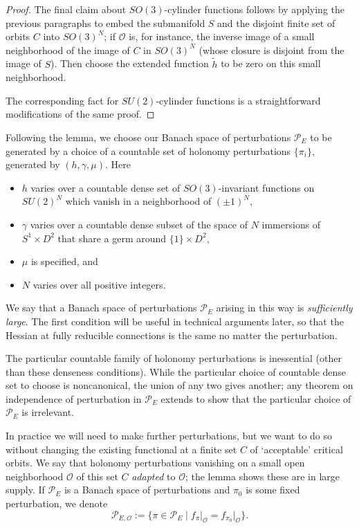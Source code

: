 \documentclass{memo-l}
\theoremstyle{definition}
\theoremstyle{remark}
\numberwithin{section}{chapter}
\numberwithin{equation}{chapter}
\begin{document}
\begin{proof}
The final claim about $SO(3)$-cylinder functions follows by applying the previous paragraphs to embed the submanifold $S$ and the disjoint finite set of orbits $C$ into $SO(3)^N$; if $\mathcal O$ is, for instance, the inverse image of a small neighborhood of the image of $C$ in $SO(3)^N$ (whose closure is disjoint from the image of $S$). Then choose the extended function $\tilde h$ to be zero on this small neighborhood.

The corresponding fact for $SU(2)$-cylinder functions is a straightforward modifications of the same proof.
\end{proof}

Following the lemma, we choose our Banach space of perturbations $\mathcal P_E$ to be generated by a choice of a countable set of holonomy perturbations $\{\pi_i\}$, generated by $(h, \gamma, \mu)$. Here 
\begin{itemize}
\item $h$ varies over a countable dense set of $SO(3)$-invariant functions on $SU(2)^N$ which vanish in a neighborhood of $(\pm 1)^N$,
\item $\gamma$ varies over a countable dense subset of the space of $N$ immersions of $S^1 \times D^2$ that share a germ around $\{1\} \times D^2$, 
\item $\mu$ is specified, and 
\item $N$ varies over all positive integers. 
\end{itemize} 

We say that a Banach space of perturbations $\mathcal P_E$ arising in this way is \textit{sufficiently large}. The first condition will be useful in technical arguments later, so that the Hessian at fully reducible connections is the same no matter the perturbation.

The particular countable family of holonomy perturbations is inessential (other than these denseness conditions). While the particular choice of countable dense set to choose is noncanonical, the union of any two gives another; any theorem on independence of perturbation in $\mathcal P_E$ extends to show that the particular choice of $\mathcal P_E$ is irrelevant. 

In practice we will need to make further perturbations, but we want to do so without changing the existing functional at a finite set $C$ of `acceptable' critical orbits. We say that holonomy perturbations vanishing on a small open neighborhood $\mathcal O$ of this set $C$ \textit{adapted} to $\mathcal O$; the lemma shows these are in large supply. If $\mathcal P_E$ is a Banach space of perturbations and $\pi_0$ is some fixed perturbation, we denote $$\mathcal P_{E,\mathcal O} := \{\pi \in \mathcal P_E \mid f_\pi\big|_{\mathcal O} = f_{\pi_0}\big|_{\mathcal O}\}.$$
\end{document}
